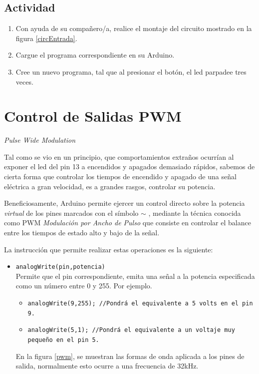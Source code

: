\documentclass[letterpaper, 10pt]{report}
\begin{document}
\subsection{Actividad}
\begin{enumerate}
\item Con ayuda de su compañero/a, realice el montaje del circuito mostrado en la figura \ref{circEntrada}.
\item Cargue el programa correspondiente en su Arduino.
\item Cree un nuevo programa, tal que al presionar el botón, el led parpadee tres veces.
\end{enumerate}

\section{Control de Salidas PWM}\label{pwmSec}

\begin{center}
{\it Pulse Wide Modulation}
\end{center}

Tal como se vio en un principio, que comportamientos extraños ocurrían al exponer el led del pin 13 a encendidos y apagados demasiado rápidos, sabemos de cierta forma que controlar los tiempos de encendido y apagado de una señal eléctrica a gran velocidad, es a grandes rasgos, controlar su potencia.

Beneficiosamente, Arduino permite ejercer un control directo sobre la potencia \emph{virtual} de los pines marcados con el símbolo $\sim$ , mediante la técnica conocida como PWM \emph{Modulación por Ancho de Pulso} que consiste en controlar el balance entre los tiempos de estado alto y bajo de la señal.

La instrucción que permite realizar estas operaciones es la siguiente:
\begin{itemize}
\item \texttt{analogWrite(pin,potencia)}\\
Permite que el pin correspondiente, emita una señal a la potencia especificada como un número entre 0 y 255. Por ejemplo.\\
\begin{itemize}
	\item \texttt{analogWrite(9,255); //Pondrá el equivalente a 5 volts en el pin 9.}\\
	\item \texttt{analogWrite(5,1);   //Pondrá el equivalente a un voltaje muy pequeño en el pin 5.}
\end{itemize}
	En la figura \ref{pwm}, se muestran las formas de onda aplicada a los pines de salida, normalmente esto ocurre a una frecuencia de 32kHz.
\end{itemize}
\end{document}
